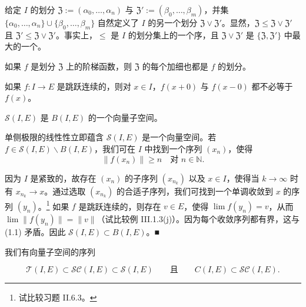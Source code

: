 \begin{remark}

\begin{items}
\item

给定 $ I $ 的划分 $ \mathfrak{Z} := (\alpha_0, \ldots, \alpha_n) $ 与 $ \mathfrak{Z}' := (\beta_0, \ldots, \beta_m) $，并集 $ \{\alpha_0, \ldots, \alpha_n\} \cup \{\beta_0, \ldots, \beta_m\} $ 自然定义了 $ I $ 的另一个划分 $ \mathfrak{Z} \vee \mathfrak{Z}' $。显然，$ \mathfrak{Z} \le \mathfrak{Z} \vee \mathfrak{Z}' $ 且 $ \mathfrak{Z}' \le \mathfrak{Z} \vee \mathfrak{Z}' $。事实上，$ \le $ 是 $ I $ 的划分集上的一个序，且 $ \mathfrak{Z} \vee \mathfrak{Z}' $ 是 $ \{\mathfrak{Z}, \mathfrak{Z}'\} $ 中最大的一个。

\item

如果 $ f $ 是划分 $ \mathfrak{Z} $ 上的阶梯函数，则 $ \mathfrak{Z} $ 的每个加细也都是 $ f $ 的划分。

\item

如果 $ f : I \to E $ 是跳跃连续的，则对 $ x \in I $，$ f(x + 0) $ 与 $ f(x - 0) $ 都不必等于 $ f(x) $。

\item

$ \mathcal{S}(I, E) $ 是 $ B(I, E) $ 的一个向量子空间。

\proofhead
单侧极限的线性性立即蕴含 $ \mathcal{S}(I, E) $ 是一个向量空间。若 $ f \in \mathcal{S}(I, E) \backslash B(I, E) $，我们可在 $ I $ 中找到一个序列 $ (x_n) $，使得
\begin{equation}
\|f(x_n)\| \ge n \quad \text{对 } n \in \mathbb{N}.\tag{1.1}
\end{equation}

因为 $ I $ 是紧致的，故存在 $ (x_n) $ 的子序列 $ (x_{n_k}) $ 以及 $ x \in I $，使得当 $ k \to \infty $ 时有 $ x_{n_k} \to x $。通过选取 $ (x_{n_k}) $ 的合适子序列，我们可找到一个单调收敛到 $ x $ 的序列 $ (y_n) $。\footnote{试比较习题 II.6.3。} 如果 $ f $ 是跳跃连续的，则存在 $ v \in E $，使得 $ \lim f(y_n) = v $，从而 $ \lim \|f(y_n)\| = \|v\| $（试比较例 III.1.3(j)）。因为每个收敛序列都有界，这与 (1.1) 矛盾。因此 $ \mathcal{S}(I, E) \subset B(I, E) $。\nobreak\hspace{0.35em}■

\item

我们有向量子空间的序列

\[
\mathcal{T}(I, E) \subset \mathcal{SC}(I, E) \subset \mathcal{S}(I, E) \qquad \text{且} \qquad C(I, E) \subset \mathcal{SC}(I, E).
\]
\item


\end{items}
\end{remark}
